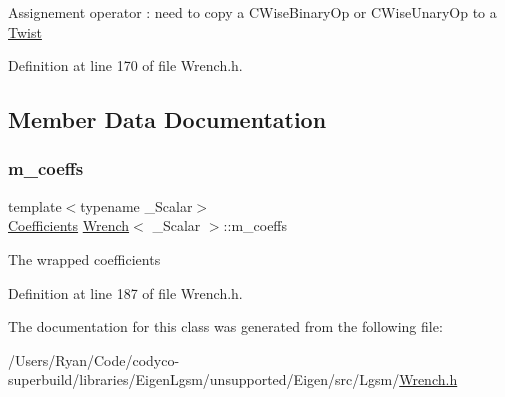 Assignement operator \+: need to copy a C\+Wise\+Binary\+Op or C\+Wise\+Unary\+Op to a \hyperlink{class_twist}{Twist} 

Definition at line 170 of file Wrench.\+h.



\subsection{Member Data Documentation}
\hypertarget{class_wrench_a3314bb14c83d52d863490c9460cacbce}{}\label{class_wrench_a3314bb14c83d52d863490c9460cacbce} 
\subsubsection{\texorpdfstring{m\+\_\+coeffs}{m\_coeffs}}
{\footnotesize\ttfamily template$<$typename \+\_\+\+Scalar$>$ \\
\hyperlink{class_wrench_a3b7401ec055bd386fc3dc826308784e8}{Coefficients} \hyperlink{class_wrench}{Wrench}$<$ \+\_\+\+Scalar $>$\+::m\+\_\+coeffs\hspace{0.3cm}{\ttfamily [protected]}}

The wrapped coefficients 

Definition at line 187 of file Wrench.\+h.



The documentation for this class was generated from the following file\+:\begin{DoxyCompactItemize}
\item 
/\+Users/\+Ryan/\+Code/codyco-\/superbuild/libraries/\+Eigen\+Lgsm/unsupported/\+Eigen/src/\+Lgsm/\hyperlink{_wrench_8h}{Wrench.\+h}\end{DoxyCompactItemize}
